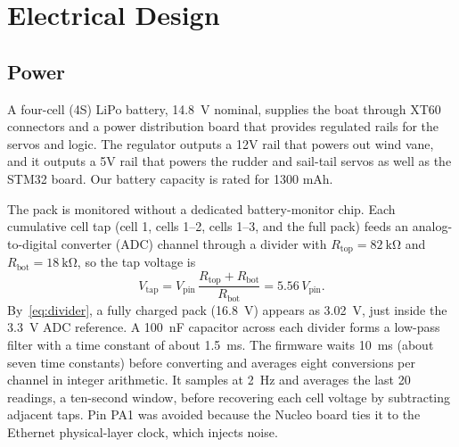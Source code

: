 \section{Electrical Design}
\label{sec:elec}

\subsection{Power}
A four-cell (4S) LiPo battery, \SI{14.8}{\volt} nominal,
supplies the boat through XT60 connectors and a power distribution board that
provides regulated rails for the servos and logic. The regulator outputs a 12V rail that powers out wind vane, and it outputs a 5V rail that powers the rudder and sail-tail servos as well as the STM32 board. Our battery capacity is rated for 1300 mAh.

The pack is monitored without a dedicated battery-monitor chip. Each
cumulative cell tap (cell 1, cells 1--2, cells 1--3, and the full pack) feeds
an analog-to-digital converter (ADC) channel through a divider with
$R_{\mathrm{top}} = \SI{82}{\kilo\ohm}$ and
$R_{\mathrm{bot}} = \SI{18}{\kilo\ohm}$, so the tap voltage is
\begin{equation}
V_{\mathrm{tap}} = V_{\mathrm{pin}}\,\frac{R_{\mathrm{top}} + R_{\mathrm{bot}}}{R_{\mathrm{bot}}}
               = 5.56\,V_{\mathrm{pin}} .
\label{eq:divider}
\end{equation}
By~\eqref{eq:divider}, a fully charged pack (\SI{16.8}{\volt}) appears as \SI{3.02}{\volt},
just inside the \SI{3.3}{\volt} ADC reference. A \SI{100}{\nano\farad}
capacitor across each divider forms a low-pass filter with a time constant of
about \SI{1.5}{\milli\second}. The firmware waits \SI{10}{\milli\second}
(about seven time constants) before converting and averages eight conversions per
channel in integer arithmetic. It samples at \SI{2}{\hertz} and averages the
last 20 readings, a ten-second window, before recovering each cell voltage by
subtracting adjacent taps. Pin PA1 was avoided because the Nucleo board ties it to the
Ethernet physical-layer clock, which injects noise.

